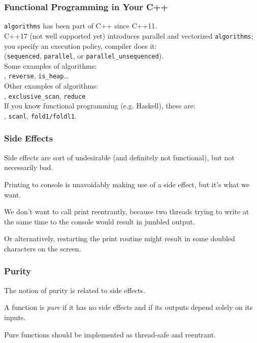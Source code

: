 \begin{frame}
\frametitle{Functional Programming in Your C++}

{\tt algorithms} has been part of C++ since C++11.\\

C++17 (not well supported yet) introduces parallel and vectorized {\tt algorithms};\\
\qquad you specify an execution policy, compiler does it:\\
\qquad ({\tt sequenced}, {\tt parallel},
or {\tt parallel\_unsequenced}).\\[1em]

Some examples of algorithms:\\
, {\tt reverse}, {\tt is\_heap}\ldots\\[1em]

Other examples of algorithms:\\
, {\tt exclusive\_scan}, {\tt reduce}\\[1em]
If you know functional programming (e.g. Haskell), these are:\\
, {\tt scanl}, {\tt fold1/foldl1}.

\end{frame}

\begin{frame}
\frametitle{Side Effects}

Side effects are sort of undesirable (and definitely not functional), but not necessarily bad. 

Printing to console is unavoidably making use of a side effect, but it's what we want. 

We don't want to call print reentrantly, because two threads trying to write at the same time to the console would result in jumbled output. 

Or alternatively, restarting the print routine might result in some doubled characters on the screen.

\end{frame}

\begin{frame}
\frametitle{Purity}

The notion of purity is related to side effects.

A function is \emph{pure} if it has no side effects and if its outputs depend solely on its inputs.

Pure functions should be implemented as thread-safe and reentrant.

\end{frame}


